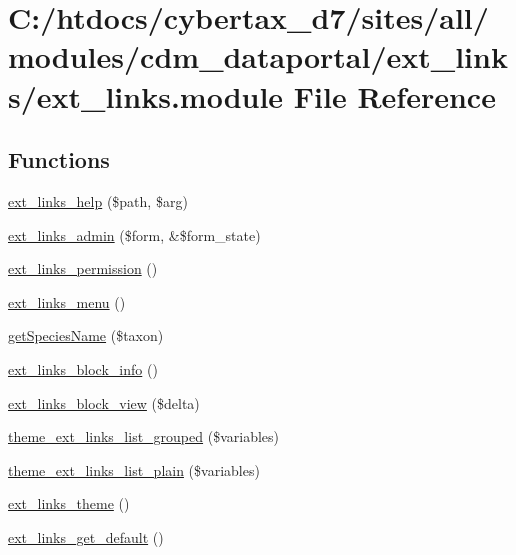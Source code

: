 \hypertarget{ext__links_8module}{\section{C\-:/htdocs/cybertax\-\_\-d7/sites/all/modules/cdm\-\_\-dataportal/ext\-\_\-links/ext\-\_\-links.module File Reference}
\label{ext__links_8module}
}
\subsection*{Functions}
\begin{DoxyCompactItemize}
\item 
\hyperlink{ext__links_8module_a4cf3001d529baa755cdbf80ddcd67069}{ext\-\_\-links\-\_\-help} (\$path, \$arg)
\item 
\hyperlink{ext__links_8module_af119d961d02bb331ef2f7e00600c8e25}{ext\-\_\-links\-\_\-admin} (\$form, \&\$form\-\_\-state)
\item 
\hyperlink{ext__links_8module_a1a8f4cfbc2b4c51d154da1e241f7295a}{ext\-\_\-links\-\_\-permission} ()
\item 
\hyperlink{ext__links_8module_a9e52affd3fcc41066061cb3996d06593}{ext\-\_\-links\-\_\-menu} ()
\item 
\hyperlink{ext__links_8module_a0fd33372225dae9bb0accf5ddc68d376}{get\-Species\-Name} (\$taxon)
\item 
\hyperlink{ext__links_8module_aaf09582c1c00cb4075c62d0bac8c1fe6}{ext\-\_\-links\-\_\-block\-\_\-info} ()
\item 
\hyperlink{ext__links_8module_a8ca7327c642f258979acf512fff1ebac}{ext\-\_\-links\-\_\-block\-\_\-view} (\$delta)
\item 
\hyperlink{ext__links_8module_ab7b773677d26f78620a416d28a6e66c1}{theme\-\_\-ext\-\_\-links\-\_\-list\-\_\-grouped} (\$variables)
\item 
\hyperlink{ext__links_8module_a47b7e1bd8d110a45c727fe476b3ea7d6}{theme\-\_\-ext\-\_\-links\-\_\-list\-\_\-plain} (\$variables)
\item 
\hyperlink{ext__links_8module_af066e6db9ea192e7763c348f722d0dc4}{ext\-\_\-links\-\_\-theme} ()
\item 
\hyperlink{ext__links_8module_a4e19644e34a58ead6c611cbce1b7aedd}{ext\-\_\-links\-\_\-get\-\_\-default} ()
\end{DoxyCompactItemize}


